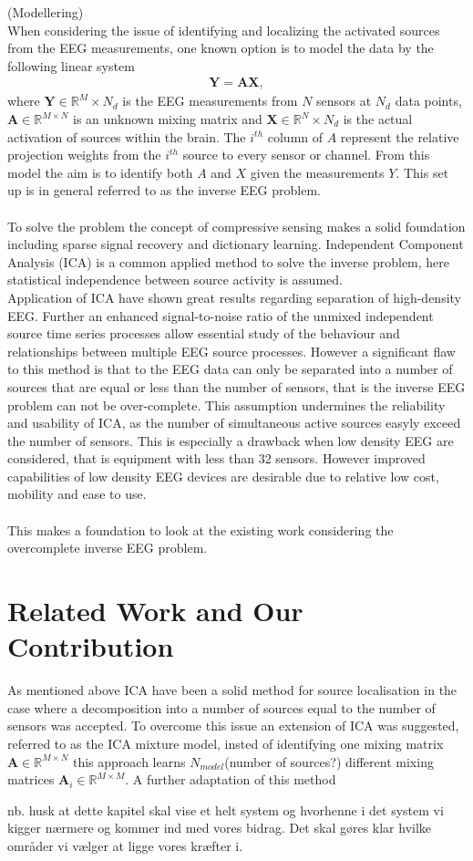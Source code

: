 (Modellering)\\
When considering the issue of identifying and localizing the activated sources from the EEG measurements, one known option is to model the data by the following linear system 
\begin{align*}
\mathbf{Y} = \mathbf{AX},
\end{align*}
where $\mathbf{Y} \in \mathbb{R}^M\times N_d$ is the EEG measurements from $N$ sensors at $N_d$ data points, $\mathbf{A} \in \mathbb{R}^{M \times N}$ is an unknown mixing matrix and $\mathbf{X} \in \mathbb{R}^N \times N_d$ is the actual activation of sources within the brain. The $i^{th}$ column of $A$ represent the relative projection weights from the $i^{th}$ source to every sensor or channel\cite{phd2015}. 
From this model the aim is to identify both $A$ and $X$ given the measurements $Y$. This set up is in general referred to as the inverse EEG problem.  \\
\\
To solve the problem the concept of compressive sensing makes a solid foundation including sparse signal recovery and dictionary learning. Independent Component Analysis (ICA) is a common applied method to solve the inverse problem\cite{Scott1996}\cite{Scott1997}, here statistical independence between source activity is assumed. \\
Application of ICA have shown great results regarding separation of high-density EEG. Further an enhanced signal-to-noise ratio of the unmixed independent source time series processes allow essential study of the behaviour and relationships between multiple EEG source processes\cite{Arnaud2012}. However a significant flaw to this method is that to the EEG data can only be separated into a number of sources that are equal or less than the number of sensors, that is the inverse EEG problem can not be over-complete. This assumption undermines the reliability and usability of ICA, as the number of simultaneous active sources easyly  exceed the number of sensors\cite{phd2015}. This is especially a drawback when low density EEG are considered, that is equipment with less than 32 sensors. However improved capabilities of low density EEG devices are desirable due to relative low cost, mobility and ease to use. \\  
\\
This makes a foundation to look at the existing work considering the overcomplete inverse EEG problem. 

\section{Related Work and Our Contribution} 
As mentioned above ICA have been a solid method for source localisation in the case where a decomposition into a number of sources equal to the number of sensors was accepted. To overcome this issue an extension of ICA was suggested, referred to as the ICA mixture model, insted of identifying one mixing matrix $\mathbf{A}\in \mathbb{R}^{M\times N}$ this approach learns $N_{model}$(number of sources?) different mixing matrices $\mathbf{A}_i\in \mathbb{R}^{M\times M}$. A further adaptation of this method   



nb. husk at dette kapitel skal vise et helt system og hvorhenne i det system vi kigger nærmere og kommer ind med vores bidrag. Det skal gøres klar hvilke områder vi vælger at ligge vores kræfter i.  





 
